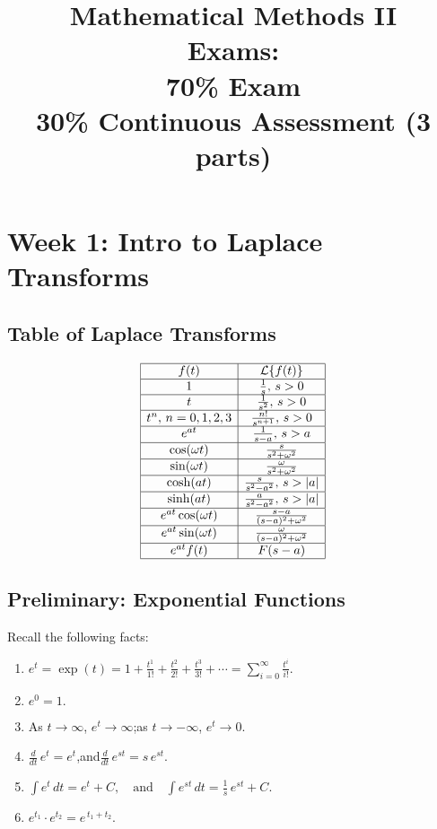 \documentclass[a4paper]{extarticle}
\title{
Mathematical Methods II\\[2ex]
Exams:\\
70\% Exam\\
30\% Continuous Assessment (3 parts)
}
\author{}
\date{}
\theoremstyle{definition}
\theoremstyle{plain}
\begin{document}
\maketitle
\pagebreak

\tableofcontents
\pagebreak

\section{Week 1: Intro to Laplace Transforms}

\subsection{Table of Laplace Transforms}
\[
  \begin{array}{|c|c|}
    \hline
    f(t)                   & \mathcal{L}\{f(t)\}               \\ \hline
    1                      & \frac{1}{s}, \, s > 0             \\ \hline
    t                      & \frac{1}{s^2}, \, s > 0           \\ \hline
    t^n, \, n = 0, 1, 2, 3 & \frac{n!}{s^{n+1}}, \, s > 0      \\ \hline
    e^{at}                 & \frac{1}{s-a}, \, s > a           \\ \hline
    \cos(\omega t)         & \frac{s}{s^2 + \omega^2}          \\ \hline
    \sin(\omega t)         & \frac{\omega}{s^2 + \omega^2}     \\ \hline
    \cosh(at)              & \frac{s}{s^2 - a^2}, \, s > |a|   \\ \hline
    \sinh(at)              & \frac{a}{s^2 - a^2}, \, s > |a|   \\ \hline
    e^{at} \cos(\omega t)  & \frac{s-a}{(s-a)^2 + \omega^2}    \\ \hline
    e^{at} \sin(\omega t)  & \frac{\omega}{(s-a)^2 + \omega^2} \\ \hline
    e^{at} f(t)            & F(s-a)                            \\ \hline
  \end{array}
\]
\subsection{Preliminary: Exponential Functions}
Recall the following facts:
\begin{enumerate}
  \item \( e^t = \exp(t) = 1 + \frac{t^1}{1!} + \frac{t^2}{2!} + \frac{t^3}{3!} + \cdots
        = \sum_{i=0}^\infty \frac{t^i}{i!}.\)
  \item \( e^0 = 1.\)
  \item As \( t \to \infty \), \( e^t \to \infty \);\quad as \( t \to -\infty \), \( e^t \to 0.\)
  \item \(\frac{d}{dt}\, e^t = e^t\),\quad and\quad \(\frac{d}{dt}\, e^{st} = s\, e^{st}.\)
  \item \(\displaystyle \int e^t\, dt = e^t + C,\quad \text{and} \quad
        \int e^{st}\, dt = \frac{1}{s}\, e^{st} + C.\)
  \item \( e^{t_1} \cdot e^{t_2} = e^{\,t_1 + t_2}.\)
\end{enumerate}
\end{document}
